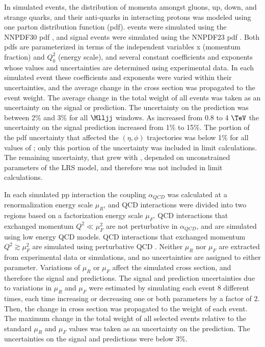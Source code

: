 In simulated events, the distribution of momenta amongst gluons, up, down, and strange quarks, and their anti-quarks in interacting 
protons was modeled using one parton distribution function (pdf).  \DY events were simulated using the NNPDF30 pdf \cite{nnpdf30}, 
and signal events were simulated using the NNPDF23 pdf \cite{nnpdf23}.  Both pdfs are parameterized in terms of the independent 
variables x (momentum fraction) and $Q_{0}^{2}$ (energy scale), and several constant coefficients and exponents whose values 
and uncertainties are determined using experimental data.  In each simulated event these coefficients and exponents were varied 
within their uncertainties, and the average change in the cross section was propagated to the event weight.  The average change 
in the total weight of all events was taken as an uncertainty on the signal or \DY prediction.  The uncertainty on the \DY 
prediction was between 2\% and 3\% for all $\Mlljj$ windows.  As \mWR increased from 0.8 to 4 $\TeV$ the uncertainty on the signal 
prediction increased from 1\% to 15\%.  The portion of the \WR pdf uncertainty that affected the $(\eta,\phi)$ trajectories was 
below 1\% for all values of \mWR; only this portion of the uncertainty was included in limit calculations.  The remaining 
uncertainty, that grew with \mWR, depended on unconstrained parameters of the LRS model, and therefore was not included in limit 
calculations.


In each simulated pp interaction the coupling $\alpha_{QCD}$ was calculated at a renormalization energy scale $\mu_{R}$, and 
QCD interactions were divided into two regions based on a factorization energy scale $\mu_{F}$.  QCD interactions that exchanged 
momentum $Q^{2} \ll \mu_{F}^{2}$ are not perturbative in $\alpha_{QCD}$, and are simulated using low energy QCD models.  QCD 
interactions that exchanged momentum $Q^{2} \gtrsim \mu_{F}^{2}$ are simulated using perturbative QCD \cite{qcdFactorizationTheory}.  
Neither $\mu_{R}$ nor $\mu_{F}$ are extracted from experimental data or simulations, and no uncertainties are assigned to either 
parameter.  Variations of $\mu_{R}$ or $\mu_{F}$ affect the simulated cross section, and therefore the signal and \DY 
predictions.  The signal and \DY prediction uncertainties due to variations in $\mu_{R}$ and $\mu_{F}$ were estimated by 
simulating each event 8 different times, each time increasing or decreasing one or both parameters by a factor of 2.  Then, the 
change in cross section was propagated to the weight of each event.  The maximum change in the total weight of all selected events 
relative to the standard $\mu_{R}$ and $\mu_{F}$ values was taken as an uncertainty on the prediction.  The uncertainties on the 
signal and \DY predictions were below 3\%.

